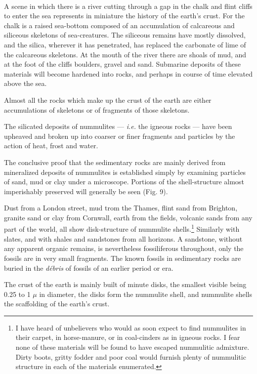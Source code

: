 \documentclass[a4paper, 12pt, oneside]{article}
\begin{document}
\paragraph{}
A scene in which there is a river cutting through a gap in the chalk and flint cliffs to enter the sea represents in miniature the history of the earth's crust. For the chalk is a raised sea-bottom composed of an accumulation of calcareous and siliceous skeletons of sea-creatures. The siliceous remains have mostly dissolved, and the silica, wherever it has penetrated, has replaced the carbonate of lime of the calcareous skeletons. At the mouth of the river there are shoals of mud, and at the foot of the cliffs boulders, gravel and sand. Submarine deposits of these materials will become hardened into rocks, and perhaps in course of time elevated above the sea.

Almost all the rocks which make up the crust of the earth are either accumulations of skeletons or of fragments of those skeletons.

The silicated deposits of nummulites --- \emph{i.e.} the igneous rocks --- have been upheaved and broken up into coarser or finer fragments and particles by the action of heat, frost and water.

The conclusive proof that the sedimentary rocks are mainly derived from mineralized deposits of nummulites is established simply by examining particles of sand, mud or clay under a microscope. Portions of the shell-structure almost imperishably preserved will generally be seen (Fig. 9).

Dust from a London street, mud trom the Thames, flint sand from Brighton, granite sand or clay from Cornwall, earth from the fields, volcanic sands from any part of the world, all show disk-structure of nummulite shells.\footnote{I have heard of unbelievers who would as soon expect to find nummulites in their carpet, in horse-manure, or in coal-cinders as in igneous rocks. I fear none of these materials will be found to have escaped nummulitic admixture. Dirty boots, gritty fodder and poor coal would furnish plenty of nummulitic structure in each of the materials enumerated.} Similarly with slates, and with shales and sandstones from all horizons. A sandstone, without any apparent organic remains, is nevertheless fossiliferous throughout, only the fossils are in very small fragments. The known fossils in sedimentary rocks are buried in the \emph{débris} of fossils of an earlier period or era.

The crust of the earth is mainly built of minute disks, the smallest visible being 0.25 to 1 $\mu$ in diameter, the disks form the nummulite shell, and nummulite shells the scaffolding of the earth's crust.
\end{document}
